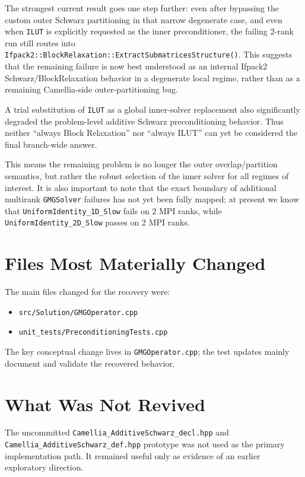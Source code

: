 \documentclass[11pt]{article}
\begin{document}
    The strongest current result goes one step further: even after bypassing the custom outer Schwarz partitioning in that narrow degenerate case, and even when \texttt{ILUT} is explicitly requested as the inner preconditioner, the failing 2-rank run still routes into \texttt{Ifpack2::BlockRelaxation::ExtractSubmatricesStructure()}. This suggests that the remaining failure is now best understood as an internal Ifpack2 Schwarz/BlockRelaxation behavior in a degenerate local regime, rather than as a remaining Camellia-side outer-partitioning bug.
    
    A trial substitution of \texttt{ILUT} as a global inner-solver replacement also significantly degraded the problem-level additive Schwarz preconditioning behavior. Thus neither ``always Block Relaxation'' nor ``always ILUT'' can yet be considered the final branch-wide answer.
    
    This means the remaining problem is no longer the outer overlap/partition semantics, but rather the robust selection of the inner solver for all regimes of interest. It is also important to note that the exact boundary of additional multirank \texttt{GMGSolver} failures has not yet been fully mapped; at present we know that \texttt{UniformIdentity\_1D\_Slow} fails on 2 MPI ranks, while \texttt{UniformIdentity\_2D\_Slow} passes on 2 MPI ranks.

\section{Files Most Materially Changed}
The main files changed for the recovery were:
\begin{itemize}
  \item \texttt{src/Solution/GMGOperator.cpp}
  \item \texttt{unit\_tests/PreconditioningTests.cpp}
\end{itemize}

The key conceptual change lives in \texttt{GMGOperator.cpp}; the test updates mainly document and validate the recovered behavior.

\section{What Was Not Revived}
The uncommitted \texttt{Camellia\_AdditiveSchwarz\_decl.hpp} and \texttt{Camellia\_AdditiveSchwarz\_def.hpp} prototype was not used as the primary implementation path. It remained useful only as evidence of an earlier exploratory direction.
\end{document}
